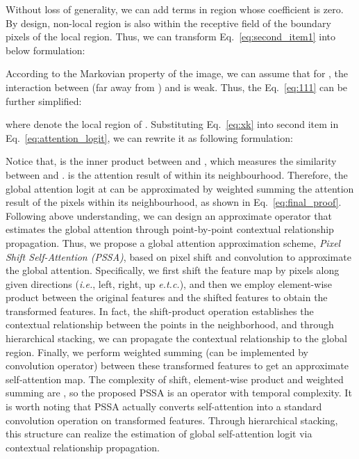 \documentclass{article}
\begin{document}
Without loss of generality, we can add terms in region  whose coefficient is zero.
By design, non-local region is also within the receptive field of the boundary pixels of the local region.
Thus, we can transform Eq.~\ref{eq:second_item1} into below formulation:

According to the Markovian property of the image, we can assume that for , the interaction between  (far away from ) and  is weak.
Thus, the Eq.~\ref{eq:111} can be further simplified:

where  denote the local region of .
Substituting Eq.~\ref{eq:xk} into second item in Eq.~\ref{eq:attention_logit}, we can rewrite it as following formulation:

Notice that, {\small} is the inner product between {\small} and {\small}, which  measures the similarity between {\small} and {\small}.
{\small} is the attention result of  within its neighbourhood.
Therefore, the global attention logit at  can be approximated by weighted summing the attention result of the pixels within its neighbourhood, as shown in Eq.~\ref{eq:final_proof}.
Following above understanding, we can design an approximate operator that estimates the global attention through point-by-point contextual relationship propagation.
Thus, we propose a global attention approximation scheme, \emph{Pixel Shift Self-Attention (PSSA)}, based on pixel shift and convolution to approximate the global attention.
Specifically, we first shift the feature map by  pixels along given directions (\emph{i.e.}, left, right, up \emph{e.t.c.}), and then we employ element-wise product between the original features and the shifted features to obtain the transformed features.
In fact, the shift-product operation establishes the contextual relationship between the points in the neighborhood, and through hierarchical stacking, we can propagate the contextual relationship to the global region.
Finally, we perform weighted summing (can be implemented by convolution operator) between these transformed features to get an approximate self-attention map.
The complexity of shift, element-wise product and weighted summing are , so the proposed PSSA is an operator with  temporal complexity.
It is worth noting that PSSA actually converts self-attention into a standard convolution operation on transformed features.
Through hierarchical stacking, this structure can realize the estimation of global self-attention logit via contextual relationship propagation.
\end{document}
